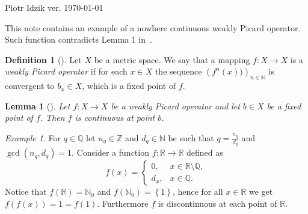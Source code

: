 \documentclass[12pt]{article}
\newcommand{\R}{\mathbb{R}}
\newcommand{\Q}{\mathbb{Q}}
\newcommand{\Z}{\mathbb{Z}}
\newcommand{\N}{\mathbb{N}}
\newcommand{\define}[1]{\textit{#1}}
\newcommand{\paren}[1]{\! \left(#1 \right)}
\newcommand{\set}[1]{\! \left\{#1 \right\}}
\theoremstyle{plain}
\newtheorem{lemma}[theorem]{Lemma}
\theoremstyle{definition}
\newtheorem{definition}[theorem]{Definition}
\theoremstyle{remark}
\newtheorem{example}[theorem]{Example}
\begin{document}
\noindent Piotr Idzik \hfill ver. \today\ \currenttime{}

\vspace*{1cm}
This note contains an example of a nowhere continuous weakly Picard operator.
Such function contradicts Lemma 1 in~\cite{VasileBerinde2011}.

\begin{definition}[{{\cite[Definition 2]{VasileBerinde2011}}}]
    Let $X$ be a metric space.
    We say that a mapping $f \colon X \to X$ is a \define{weakly Picard operator} if
    for each $x \in X$ the sequence $\paren{f^n\paren{x})}_{n \in \N}$
    is convergent to $b_x \in X$, which is a fixed point of $f$.
\end{definition}

\begin{lemma}[{{\cite[Lemma 1]{VasileBerinde2011}}}]
    Let $f \colon X \to X$ be a weakly Picard operator and let $b \in X$ be a fixed point of $f$.
    Then $f$ is continuous at point $b$. 
\end{lemma}

\begin{example}
    For $q \in \Q$ let $n_q \in \Z$ and $d_q \in \N$ be such that $q = \frac{n_q}{d_q}$ and $\gcd\paren{n_q, d_q} = 1$.
    Consider a function $f \colon \R \to \R$ defined as
    \begin{equation*}
        f(x) = \left\{ \begin{array}{ll}
            0, & x \in \R \setminus \Q,\\
            d_x, & x \in \Q.
               \end{array} \right.
    \end{equation*} 
    Notice that $f(\R) = \N_0$ and $f(\N_0) = \set{1}$, hence for all $x \in \R$ we get $f\paren{f\paren{x}} = 1 = f\paren{1}$.
    Furthermore $f$ is discontinuous at each point of $\R$.       
\end{example}

{}

\end{document}

